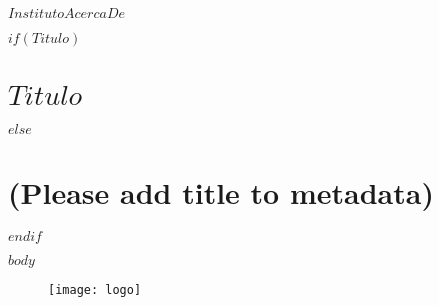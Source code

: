 \documentclass[11pt,fleqn]{book} %
\begin{document}
$InstitutoAcercaDe$



$if(Titulo)$
\chapter{$Titulo$}
$else$
\chapter{(Please add title to metadata)}
$endif$

$body$







\newpage
\vfill
\thispagestyle{empty}

\begin{figure}
  \centering
    \texttt{[image: logo]}
\end{figure}


\vfill
\end{document}
